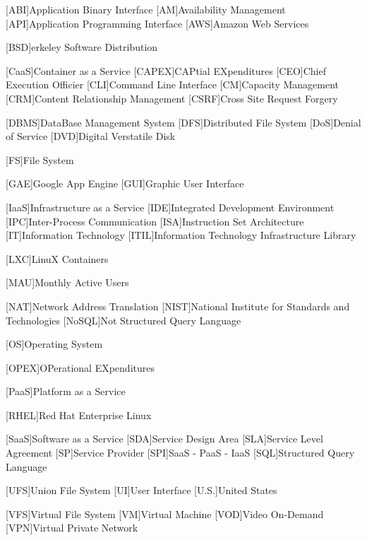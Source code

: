 %
%
[ABI]{Application Binary Interface}
[AM]{Availability Management}
[API]{Application Programming Interface}
[AWS]{Amazon Web Services}

[BSD]{erkeley Software Distribution}

[CaaS]{Container as a Service}
[CAPEX]{CAPtial EXpenditures}
[CEO]{Chief Execution Officier}
[CLI]{Command Line Interface}
[CM]{Capacity Management}
[CRM]{Content Relationship Management}
[CSRF]{Cross Site Request Forgery}

[DBMS]{DataBase Management System}
[DFS]{Distributed File System}
[DoS]{Denial of Service}
[DVD]{Digital Verstatile Disk}

[FS]{File System}

[GAE]{Google App Engine}
[GUI]{Graphic User Interface}

[IaaS]{Infrastructure as a Service}
[IDE]{Integrated Development Environment}
[IPC]{Inter-Process Communication}
[ISA]{Instruction Set Architecture}
[IT]{Information Technology}
[ITIL]{Information Technology Infrastructure Library}

[LXC]{LinuX Containers}

[MAU]{Monthly Active Users}

[NAT]{Network Address Translation}
[NIST]{National Institute for Standards and Technologies}
[NoSQL]{Not Structured Query Language}

[OS]{Operating System}

[OPEX]{OPerational EXpenditures}

[PaaS]{Platform as a Service}

[RHEL]{Red Hat Enterprise Linux}

[SaaS]{Software as a Service}
[SDA]{Service Design Area}
[SLA]{Service Level Agreement}
[SP]{Service Provider}
[SPI]{SaaS - PaaS - IaaS}
[SQL]{Structured Query Language}

[UFS]{Union File System}
[UI]{User Interface}
[U.S.]{United States}

[VFS]{Virtual File System}
[VM]{Virtual Machine}
[VOD]{Video On-Demand}
[VPN]{Virtual Private Network}